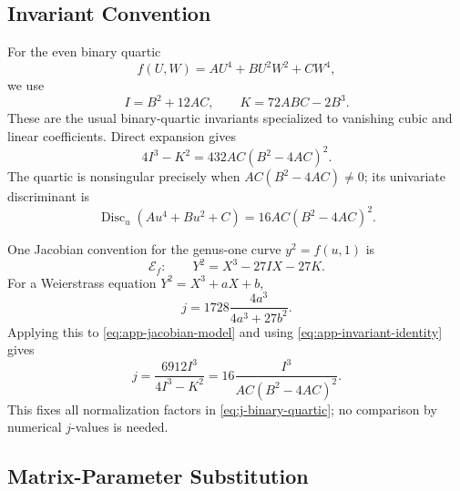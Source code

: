 \documentclass[11pt,reqno]{amsart}
\theoremstyle{remark}
\begin{document}
\subsection{Invariant Convention}

For the even binary quartic
\begin{equation}\label{eq:app-binary-quartic}
 f(U,W)=AU^4+BU^2W^2+CW^4,
\end{equation}
we use
\begin{equation}\label{eq:app-IK}
 I=B^2+12AC,
 \qquad
 K=72ABC-2B^3.
\end{equation}
These are the usual binary-quartic invariants specialized to vanishing cubic
and linear coefficients.  Direct expansion gives
\begin{equation}\label{eq:app-invariant-identity}
 4I^3-K^2=432AC(B^2-4AC)^2.
\end{equation}
The quartic is nonsingular precisely when
$AC(B^2-4AC)\ne0$; its univariate discriminant is
\begin{equation}\label{eq:app-quartic-discriminant}
 \operatorname{Disc}_u(Au^4+Bu^2+C)
 =16AC(B^2-4AC)^2.
\end{equation}

One Jacobian convention for the genus-one curve $y^2=f(u,1)$ is
\begin{equation}\label{eq:app-jacobian-model}
 \mathcal E_f:\qquad
 Y^2=X^3-27IX-27K.
\end{equation}
For a Weierstrass equation $Y^2=X^3+aX+b$,
\begin{equation}\label{eq:app-weierstrass-j}
 j=1728\frac{4a^3}{4a^3+27b^2}.
\end{equation}
Applying this to \eqref{eq:app-jacobian-model} and using
\eqref{eq:app-invariant-identity} gives
\begin{equation}\label{eq:app-quartic-j}
 j=\frac{6912I^3}{4I^3-K^2}
 =16\frac{I^3}{AC(B^2-4AC)^2}.
\end{equation}
This fixes all normalization factors in \eqref{eq:j-binary-quartic}; no
comparison by numerical $j$-values is needed.

\subsection{Matrix-Parameter Substitution}
\end{document}
